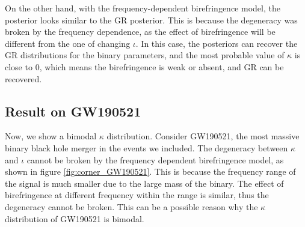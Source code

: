 \documentclass[aps,prd,twocolumn,superscriptaddress,preprintnumbers,floatfix,nofootinbib]{revtex4-2}
\begin{document}
On the other hand, with the frequency-dependent birefringence model, the posterior looks similar to the GR posterior.
This is because the degeneracy was broken by the frequency dependence, as the effect of birefringence will be different from the one of changing $\iota$.
In this case, the posteriors can recover the GR distributions for the binary parameters, and the most probable value of $\kappa$ is close to $0$, which means the birefringence is weak or absent, and GR can be recovered.


\subsection{Result on GW190521}

Now, we show a bimodal $\kappa$ distribution.
Consider GW190521, the most massive binary black hole merger in the events we included.
The degeneracy between $\kappa$ and $\iota$ cannot be broken by the frequency dependent birefringence model, as shown in figure \ref{fig:corner_GW190521}.
This is because the frequency range of the signal is much smaller due to the large mass of the binary.
The effect of birefringence at different frequency within the range is similar, thus the degeneracy cannot be broken.
This can be a possible reason why the $\kappa$ distribution of GW190521 is bimodal.

\end{document}
